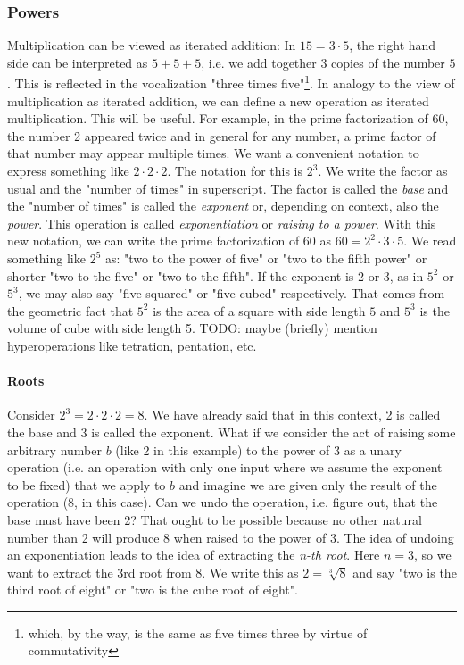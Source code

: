 \subsubsection{Powers}
Multiplication can be viewed as iterated addition: In $15 = 3 \cdot 5$, the right hand side can be interpreted as $5 + 5 + 5$, i.e. we add together $3$ copies of the number $5$. This is reflected in the vocalization "three times five"\footnote{which, by the way, is the same as five times three by virtue of commutativity}. In analogy to the view of multiplication as iterated addition, we can define a new operation as iterated multiplication. This will be useful. For example, in the prime factorization of 60, the number 2 appeared twice and in general for any number, a prime factor of that number may appear multiple times. We want a convenient notation to express something like $2 \cdot 2 \cdot 2$. The notation for this is $2^3$. We write the factor as usual and the "number of times" in superscript. The factor is called the \emph{base} and the "number of times" is called the \emph{exponent} or, depending on context, also the \emph{power}. This operation is called \emph{exponentiation} or \emph{raising to a power}. With this new notation, we can write the prime factorization of 60 as $60 = 2^2 \cdot 3 \cdot 5$.  We read something like $2^5$ as: "two to the power of five" or "two to the fifth power" or shorter "two to the five" or "two to the fifth". If the exponent is 2 or 3, as in $5^2$ or $5^3$, we may also say "five squared" or "five cubed" respectively. That comes from the geometric fact that $5^2$ is the area of a square with side length $5$ and $5^3$ is the volume of cube with side length 5. TODO: maybe (briefly) mention hyperoperations like tetration, pentation, etc.

\paragraph{Roots}
Consider $2^3 = 2 \cdot 2 \cdot 2 = 8$. We have already said that in this context, 2 is called the base and 3 is called the exponent. What if we consider the act of raising some arbitrary number $b$ (like 2 in this example) to the power of 3 as a unary operation (i.e. an operation with only one input where we assume the exponent to be fixed) that we apply to $b$ and imagine we are given only the result of the operation (8, in this case). Can we undo the operation, i.e. figure out, that the base must have been 2? That ought to be possible because no other natural number than 2 will produce 8 when raised to the power of 3. The idea of undoing an exponentiation leads to the idea of extracting the \emph{n-th root}. Here $n = 3$, so we want to extract the 3rd root from 8. We write this as $2 =\sqrt[3]{8}$ and say "two is the third root of eight" or "two is the cube root of eight".

